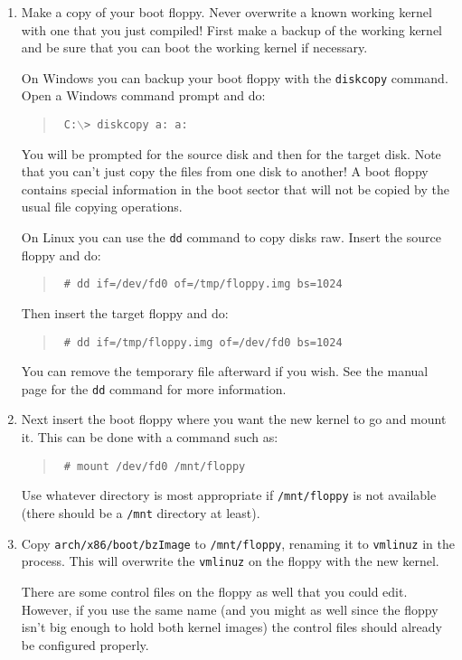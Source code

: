 \documentclass{article}
\newcommand{\command}[1]{\texttt{#1}}
\newcommand{\filename}[1]{\texttt{#1}}
\newenvironment{commands}
  {\begin{quote} \tt}
  {\end{quote}}
\begin{document}
\begin{enumerate}

\item Make a copy of your boot floppy. Never overwrite a known working kernel with one that you
  just compiled! First make a backup of the working kernel and be sure that you can boot the
  working kernel if necessary.

  On Windows you can backup your boot floppy with the \command{diskcopy} command. Open a Windows
  command prompt and do:
  \begin{commands}
    C:$\backslash$> diskcopy a: a:
  \end{commands}

  You will be prompted for the source disk and then for the target disk. Note that you can't
  just copy the files from one disk to another! A boot floppy contains special information in
  the boot sector that will not be copied by the usual file copying operations.

  On Linux you can use the \command{dd} command to copy disks raw. Insert the source floppy and
  do:
  \begin{commands}
    \# dd if=/dev/fd0 of=/tmp/floppy.img bs=1024
  \end{commands}

  Then insert the target floppy and do:
  \begin{commands}
    \# dd if=/tmp/floppy.img of=/dev/fd0 bs=1024
  \end{commands}

  You can remove the temporary file afterward if you wish. See the manual page for the
  \command{dd} command for more information.

\item Next insert the boot floppy where you want the new kernel to go and mount it. This can be
  done with a command such as:
  \begin{commands}
    \# mount /dev/fd0 /mnt/floppy
  \end{commands}

  Use whatever directory is most appropriate if \filename{/mnt/floppy} is not available (there
  should be a \filename{/mnt} directory at least).

\item Copy \filename{arch/x86/boot/bzImage} to \filename{/mnt/floppy}, renaming it to
  \filename{vmlinuz} in the process. This will overwrite the \filename{vmlinuz} on the floppy
  with the new kernel.

  There are some control files on the floppy as well that you could edit. However, if you use
  the same name (and you might as well since the floppy isn't big enough to hold both kernel
  images) the control files should already be configured properly.


\end{enumerate}
\end{document}
